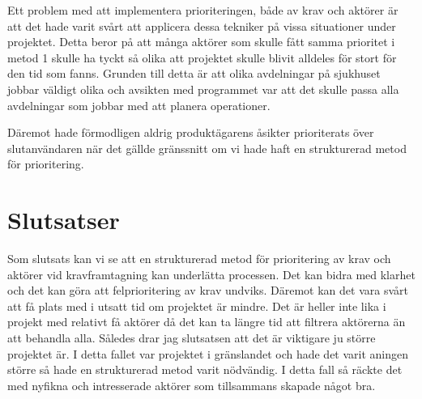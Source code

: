 Ett problem med att implementera prioriteringen, både av krav och aktörer är att det hade varit svårt att applicera dessa tekniker på vissa situationer under projektet. Detta beror på att många aktörer som skulle fått samma prioritet i metod 1 skulle ha tyckt så olika att projektet skulle blivit alldeles för stort för den tid som fanns. Grunden till detta är att olika avdelningar på sjukhuset jobbar väldigt olika och avsikten med programmet var att det skulle passa alla avdelningar som jobbar med att planera operationer.

Däremot hade förmodligen aldrig produktägarens åsikter prioriterats över slutanvändaren när det gällde gränssnitt om vi hade haft en strukturerad metod för prioritering.


\section{Slutsatser}
Som slutsats kan vi se att en strukturerad metod för prioritering av krav och aktörer vid kravframtagning kan underlätta processen. Det kan bidra med klarhet och det kan göra att felprioritering av krav undviks. Däremot kan det vara svårt att få plats med i utsatt tid om projektet är mindre. Det är heller inte lika i projekt med relativt få aktörer då det kan ta längre tid att filtrera aktörerna än att behandla alla. Således drar jag slutsatsen att det är viktigare ju större projektet är. I detta fallet var projektet i gränslandet och hade det varit aningen större så hade en strukturerad metod varit nödvändig. I detta fall så räckte det med nyfikna och intresserade aktörer som tillsammans skapade något bra.
